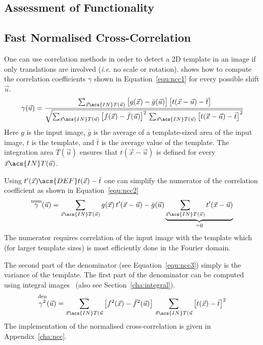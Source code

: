 \documentclass[12pt,a4paper,oneside,openright]{book}
\newcommand{\ie}{\emph{i.e.} }
\newcommand{\sct}[1]{Section~\ref{cha:#1}}
\newcommand{\equ}[1]{Equation~\ref{equ:#1}}
\newcommand{\anx}[1]{Appendix~\ref{cha:#1}}
\begin{document}
\begin{CJK}{UTF8}{}
\section{Assessment of Functionality}\label{cha:app}
\subsection{Fast Normalised Cross-Correlation}
One can use correlation methods in order to detect a \ac{2D} template in an image if only translations are involved (\ie no scale or rotation). \citet{lewis1995fast} shows how to compute the correlation coefficients $\gamma$ shown in \equ{ncc1} for every possible shift $\vec{u}$.
\begin{equation}\label{equ:ncc1}
  \gamma(\vec{u})=\cfrac{\sum_{\vec{x}\acs{IN}T(\vec{u})}\big[g(\vec{x})-\bar{g}(\vec{u})\big]\,\big[t(\vec{x}-\vec{u})-\bar{t}\big]}{\sqrt{\sum_{\vec{x}\acs{IN}T(\vec{u})}\big[f(\vec{x})-\bar{f}(\vec{u})\big]^2\,\sum_{\vec{x}\acs{IN}T(\vec{u})}\big[t(\vec{x}-\vec{u})-\bar{t}\big]^2}}
\end{equation}
Here $g$ is the input image, $\bar{g}$ is the average of a template-sized area of the input image, $t$ is the template, and $\bar{t}$ is the average value of the template. The integration area $T(\vec{u})$ ensures that $t(\vec{x}-\vec{u})$ is defined for every $\vec{x}\acs{IN}T(\vec{u})$.

Using $t^\prime(\vec{x})\acs{DEF}t(\vec{x})-\bar{t}$ one can simplify the numerator of the correlation coefficient as shown in \equ{ncc2}
\begin{equation}\label{equ:ncc2}
  \overset{\operatorname{num}}{\gamma}(\vec{u})=\sum_{\vec{x}\acs{IN}T(\vec{u})}g(\vec{x})\,t^\prime(\vec{x}-\vec{u})-\bar{g}(\vec{u})\underbrace{\sum_{\vec{x}\acs{IN}T(\vec{u})}t^\prime(\vec{x}-\vec{u})}_{=0}
\end{equation}
The numerator requires correlation of the input image with the template which (for larger template sizes) is most efficiently done in the Fourier domain.

The second part of the denominator (see \equ{ncc3}) simply is the variance of the template. The first part of the denominator can be computed using integral images~\citep{lewis1995fast} (also see \sct{integral}).
\begin{equation}\label{equ:ncc3}
  \overset{\operatorname{den}}{\gamma^2}(\vec{u})=\sum_{\vec{x}\acs{IN}T(\vec{u}}\big[f^2(\vec{x})-\bar{f}^2(\vec{u})\big]\,\sum_{\vec{x}\acs{IN}T(\vec{u}}\big[t(\vec{x})-\bar{t}\big]^2
\end{equation}
The implementation of the normalised cross-correlation is given in \anx{ncc}.


\end{CJK}
\end{document}
